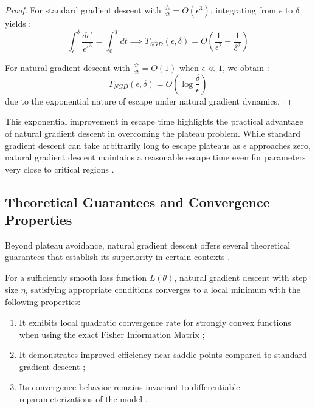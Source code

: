 \documentclass[a4paper]{article}
\begin{document}
\begin{proof}
For standard gradient descent with $\frac{d\epsilon}{dt} = O(\epsilon^3)$, integrating from $\epsilon$ to $\delta$ yields \cite{wei2008dynamics}:
\begin{equation}
\int_{\epsilon}^{\delta} \frac{d\epsilon'}{\epsilon'^3} = \int_0^T dt \implies T_{SGD}(\epsilon, \delta) = O\left(\frac{1}{\epsilon^2} - \frac{1}{\delta^2}\right)
\end{equation}

For natural gradient descent with $\frac{d\epsilon}{dt} = O(1)$ when $\epsilon \ll 1$, we obtain \cite{amari1998natural}:
\begin{equation}
T_{NGD}(\epsilon, \delta) = O\left(\log\frac{\delta}{\epsilon}\right)
\end{equation}
due to the exponential nature of escape under natural gradient dynamics.
\end{proof}

This exponential improvement in escape time highlights the practical advantage of natural gradient descent in overcoming the plateau problem. While standard gradient descent can take arbitrarily long to escape plateaus as $\epsilon$ approaches zero, natural gradient descent maintains a reasonable escape time even for parameters very close to critical regions \cite{martens2015optimizing}.

\subsection{Theoretical Guarantees and Convergence Properties}

Beyond plateau avoidance, natural gradient descent offers several theoretical guarantees that establish its superiority in certain contexts \cite{kunstner2019limitations, martens2010deep}.

\begin{theorem}
For a sufficiently smooth loss function $L(\theta)$, natural gradient descent with step size $\eta_t$ satisfying appropriate conditions converges to a local minimum with the following properties:
\begin{enumerate}
    \item It exhibits local quadratic convergence rate for strongly convex functions when using the exact Fisher Information Matrix \cite{amari1998natural, martens2020new};
    \item It demonstrates improved efficiency near saddle points compared to standard gradient descent \cite{dauphin2014identifying, pascanu2013revisiting};
    \item Its convergence behavior remains invariant to differentiable reparameterizations of the model \cite{amari1998natural, ollivier2017information}.
\end{enumerate}
\end{theorem}
\end{document}
